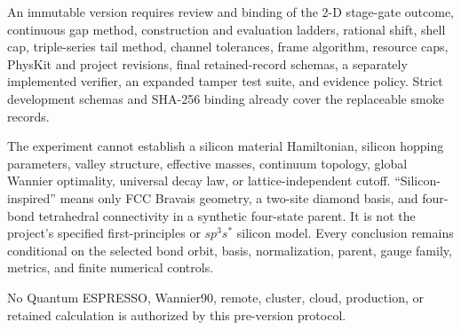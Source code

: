 \documentclass[11pt]{article}
\begin{document}
An immutable version requires review and binding of the 2-D stage-gate outcome,
continuous gap method, construction and evaluation ladders, rational shift, shell cap,
triple-series tail method, channel tolerances, frame algorithm, resource caps, PhysKit
and project revisions, final retained-record schemas, a separately implemented verifier,
an expanded tamper test suite, and evidence policy. Strict development schemas and
SHA-256 binding already cover the replaceable smoke records.

The experiment cannot establish a silicon material Hamiltonian, silicon hopping
parameters, valley structure, effective masses, continuum topology, global Wannier
optimality, universal decay law, or lattice-independent cutoff.  ``Silicon-inspired''
means only FCC Bravais geometry, a two-site diamond basis, and four-bond tetrahedral
connectivity in a synthetic four-state parent.  It is not the project's specified
first-principles or $sp^3s^*$ silicon model.  Every conclusion remains conditional on
the selected bond orbit, basis, normalization, parent, gauge family, metrics, and finite
numerical controls.

No Quantum ESPRESSO, Wannier90, remote, cluster, cloud, production, or retained
calculation is authorized by this pre-version protocol.



\end{document}
